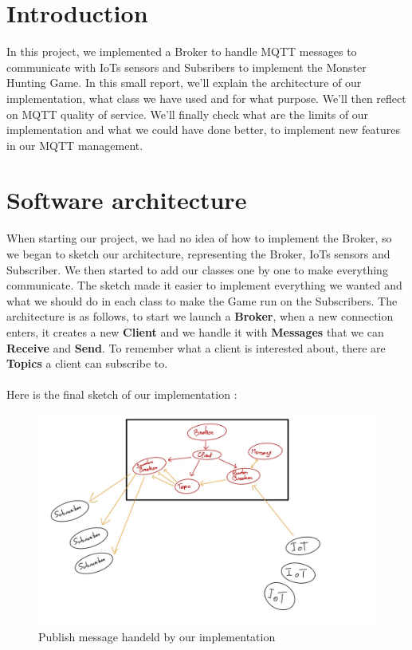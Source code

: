 \documentclass[12pt]{article}
\begin{document}
 \thispagestyle{empty}
 \tableofcontents
 \pagebreak
 \setcounter{page}{1}

 \section{Introduction}
 In this project, we implemented a Broker to handle MQTT messages to communicate with IoTs sensors 
 and Subsribers to implement the Monster Hunting Game. In this small report, we'll explain the architecture of our implementation, 
 what class we have used and for what purpose. We'll then reflect on MQTT quality of service. We'll finally check what are the limits of our implementation and what we could have done better, 
 to implement new features in our MQTT management.

 \section{Software architecture}
 When starting our project, we had no idea of how to implement the Broker, so we began to sketch our architecture, 
 representing the Broker, IoTs sensors and Subscriber. We then started to add our classes one by one to make everything communicate. 
 The sketch made it easier to implement everything we wanted and what we should do in each class to make the Game run on the Subscribers. 
 The architecture is as follows, to start we launch a \textbf{Broker}, when a new connection enters, it creates a new \textbf{Client} and we handle it 
 with \textbf{Messages} that we can \textbf{Receive} and \textbf{Send}. To remember what a client is interested about, there are \textbf{Topics} a client 
 can subscribe to.
 \\\\

 Here is the final sketch of our implementation : 
 
 \begin{figure}[!h]
	 \centering
	 \includegraphics[scale = 0.22]{PublishMessage.jpg}
	 \caption{Publish message handeld by our implementation}
 \end{figure}
\end{document}
